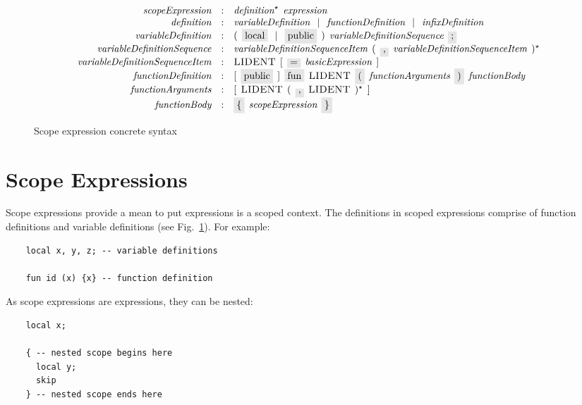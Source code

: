 \begin{figure}[t]
  \[
    \begin{array}{rcl}
      \defterm{scopeExpression}                & : & \nonterm{definition}^\star\s\nonterm{expression}\\
      \defterm{definition}                     & : & \nonterm{variableDefinition}\alt\nonterm{functionDefinition}\alt\nonterm{infixDefinition}\\
      \defterm{variableDefinition}             & : & (\s\term{local}\alt\term{public}\s)\s\nonterm{variableDefinitionSequence}\s\term{;}\\
      \defterm{variableDefinitionSequence}     & : & \nonterm{variableDefinitionSequenceItem}\s(\s\term{,}\s\nonterm{variableDefinitionSequenceItem}\s)^\star\\
      \defterm{variableDefinitionSequenceItem} & : & \token{LIDENT}\s[\s\term{=}\s\nonterm{basicExpression}\s]\\
      \defterm{functionDefinition}             & : & [\s\term{public}\s]\s\term{fun}\s\token{LIDENT}\s\term{(}\s\nonterm{functionArguments}\s\term{)}\s\nonterm{functionBody}\\
      \defterm{functionArguments}              & : & [\s\token{LIDENT}\s(\s\term{,}\s\token{LIDENT}\s)^\star\s]\\
      \defterm{functionBody}                   & : & \term{\{}\s\nonterm{scopeExpression}\s\term{\}}
    \end{array}
  \]
  \caption{Scope expression concrete syntax}
  \label{scope_expression}
\end{figure}

\section{Scope Expressions}

Scope expressions provide a mean to put expressions is a scoped context. The definitions in scoped expressions comprise of function definitions and
variable definitions (see Fig.~\ref{scope_expression}). For example:

\begin{lstlisting}
    local x, y, z; -- variable definitions

    fun id (x) {x} -- function definition
\end{lstlisting}

As scope expressions are expressions, they can be nested:

\begin{lstlisting}
    local x;

    { -- nested scope begins here
      local y;
      skip
    } -- nested scope ends here
\end{lstlisting}

